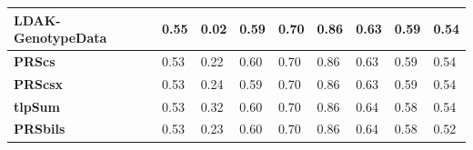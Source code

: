 \documentclass[pdflatex,sn-nature]{sn-jnl}%
\begin{document}
\begin{table}[!ht]
{\begin{tabular}{|l|l|l|l|l|l|l|l|l|}
\textbf{LDAK-GenotypeData} \cite{Zhang_2021}  & \cellcolor[HTML]{DAE182}0.55 & \cellcolor[HTML]{F86C6B}0.02 & \cellcolor[HTML]{E5E483}0.59 & \cellcolor[HTML]{FEEA83}0.70                                                     & \cellcolor[HTML]{FFEB84}0.86                                         & \cellcolor[HTML]{FED980}0.63                                                 & \cellcolor[HTML]{FBAD78}0.59                                                    & \cellcolor[HTML]{FEE081}0.54 \\ \hline
\textbf{PRScs}      \cite{Ge_2019}         & \cellcolor[HTML]{FEE482}0.53 & \cellcolor[HTML]{FEE783}0.22 & \cellcolor[HTML]{D5DF82}0.60 & \cellcolor[HTML]{FEDA80}0.70                                                     & \cellcolor[HTML]{FEEB84}0.86                                         & \cellcolor[HTML]{FCBE7B}0.63                                                 & \cellcolor[HTML]{FBA276}0.59                                                    & \cellcolor[HTML]{FEE683}0.54 \\ \hline
\textbf{PRScsx}     \cite{Ruan_2022}         & \cellcolor[HTML]{F9EA84}0.53 & \cellcolor[HTML]{FBEA84}0.24 & \cellcolor[HTML]{EBE683}0.59 & \cellcolor[HTML]{FED980}0.70                                                     & \cellcolor[HTML]{FEEB84}0.86                                         & \cellcolor[HTML]{FCBD7B}0.63                                                 & \cellcolor[HTML]{FBA175}0.59                                                    & \cellcolor[HTML]{FFEB84}0.54 \\ \hline
\textbf{tlpSum}    \cite{Pattee_2020}          & \cellcolor[HTML]{F4E884}0.53 & \cellcolor[HTML]{ADD480}0.32 & \cellcolor[HTML]{C7DB81}0.60 & \cellcolor[HTML]{FCEA84}0.70                                                     & \cellcolor[HTML]{FDEB84}0.86                                         & \cellcolor[HTML]{FFEB84}0.64                                                 & \cellcolor[HTML]{F98470}0.58                                                    & \cellcolor[HTML]{FEEA83}0.54 \\ \hline
\textbf{PRSbils}             & \cellcolor[HTML]{F6E984}0.53 & \cellcolor[HTML]{FCEB84}0.23 & \cellcolor[HTML]{D3DF82}0.60 & \cellcolor[HTML]{FEDC81}0.70                                                     & \cellcolor[HTML]{FEEA83}0.86                                         & \cellcolor[HTML]{EEE683}0.64                                                 & \cellcolor[HTML]{F8696B}0.58                                                    & \cellcolor[HTML]{F98370}0.52 \\ \hline

\end{tabular}}
\end{table}
\end{document}
